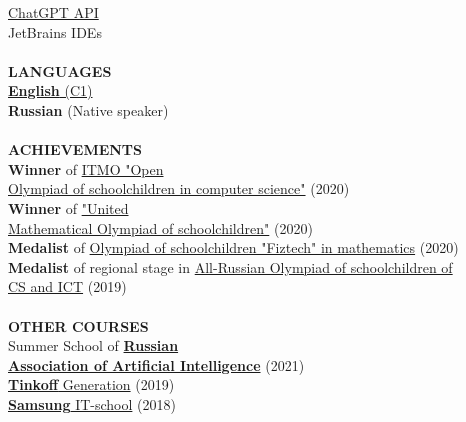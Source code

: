 \documentclass{article}
\begin{document}
\begin{vwcol}[widths={0.8,0.2},
 sep=.8cm, justify=flush,rule=0pt,indent=1em]
{\href{https://github.com/NikPeg/ScriboTZ}{ChatGPT API}\\
JetBrains IDEs\\
}
\\
\noindent\textcolor[rgb]{0.1255,0.2902,0.7843}{\textbf{LANGUAGES}}\\
\href{https://nikpeg.github.io/docs/IELTS.pdf}{\textbf{English} (C1)}\\
\textbf{Russian} (Native speaker)\\
\\
\noindent\textcolor[rgb]{0.1255,0.2902,0.7843}{\textbf{ACHIEVEMENTS}}\\
\textbf{Winner} of \href{https://olymp.itmo.ru/}{ITMO "Open\\ Olympiad of schoolchildren in computer science"} (2020)\\
\textbf{Winner} of \href{https://olympiads.mccme.ru/ommo/23/}{"United\\Mathematical Olympiad of schoolchildren"} (2020)\\
\textbf{Medalist} of \href{https://olymp.mipt.ru/}{Olympiad of schoolchildren "Fiztech" in mathematics} (2020)\\
\textbf{Medalist} of regional stage in \href{https://vos.olimpiada.ru/}{All-Russian Olympiad of schoolchildren of\\
 CS and ICT} (2019)\\
\\
\noindent\textcolor[rgb]{0.1255,0.2902,0.7843}{\textbf{OTHER COURSES}}\\
Summer School of \href{https://raai.space/}{\textbf{Russian\\
Association of Artificial Intelligence}} (2021)\\
\href{https://fintech.tinkoff.ru/school/generation/}{\textbf{Tinkoff} Generation} (2019)\\
\href{https://myitschool.ru/}{\textbf{Samsung} IT-school} (2018)\\
\end{vwcol} 
\end{document}
